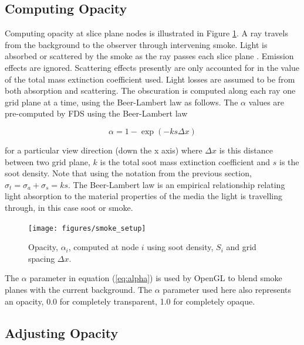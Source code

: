 \subsection{Computing Opacity}
Computing opacity at slice plane nodes is illustrated in Figure \ref{figsmokesetup}. A ray travels from the background to the observer through intervening smoke. Light is absorbed or scattered by the smoke as the ray passes each slice plane .  Emission effects are ignored. Scattering effects presently are only accounted for in the value of the total mass extinction coefficient used.  Light losses are assumed to be from both absorption and scattering. The obscuration is computed along each ray one grid plane at a time, using the Beer-Lambert law as follows.  The $\alpha$ values are pre-computed by FDS using the Beer-Lambert law~\cite{Siegel:2001}

\begin{equation}
\alpha=1-\exp(-ks\Delta x) \label{eq:alpha}
\end{equation}

\noindent for a particular view direction (down the x axis) where $\Delta x$ is this distance between two grid plane, $k$ is the total soot mass extinction coefficient and $s$ is the soot density.  Note that using the notation from the previous section, $\sigma_t=\sigma_a+\sigma_s=ks$.  The Beer-Lambert law is an empirical relationship relating light absorption to the material properties of the media the light is travelling through, in this case soot or smoke.

\begin{figure}[\figoptions]
\begin{center}
\texttt{[image: figures/smoke\_setup]}
\end{center}
\caption {Opacity, $\alpha_i$, computed at node $i$ using soot density, $S_i$ and grid spacing $\Delta x$.}
\label{figsmokesetup}
\end{figure}

The $\alpha$ parameter in equation (\ref{eq:alpha}) is used by OpenGL to blend smoke planes with the current background.  The $\alpha$ parameter used here also represents an opacity, 0.0 for completely transparent, 1.0 for completely opaque.

%
%

\subsection{Adjusting Opacity}

